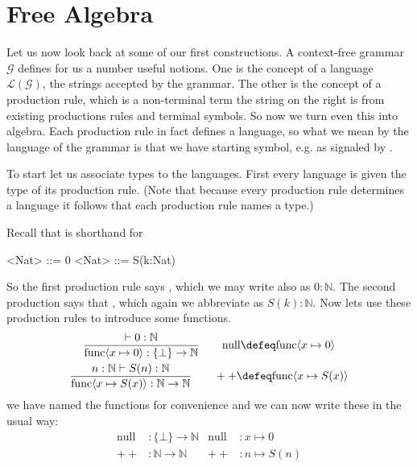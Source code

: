 
\section{Free Algebra}
Let us now look back at some of our first constructions.
A context-free grammar $\mathcal{G}$ defines for us a number 
useful notions.  One is the concept of a language 
$\mathcal{L}(\mathcal{G})$, the strings 
accepted by the grammar.  The other is the concept of a production 
rule, which is a non-terminal term  the string on the 
right is from existing productions rules and terminal symbols.  So 
now we turn even this into algebra.  Each production rule in fact defines a 
language, so what we mean by the language of the grammar is that we have 
starting symbol, e.g. as signaled by .  

To start let us associate types to the languages.  
First every language is given the type of its production rule.
(Note that because every production rule determines a language 
it follows that each production rule names a type.)

\begin{example}
    Recall that  is shorthand for 
\begin{Gcode}[]
<Nat> ::= 0
<Nat> ::= S(k:Nat)
\end{Gcode}
So the first production rule says , which we may write also 
as $0:\mathbb{N}$.
The second production says that , which again we abbreviate 
as $S(k):\mathbb{N}$.
Now lets use these production rules to introduce some functions.
\begin{gather*}
    \frac{
        \vdash 0:\mathbb{N}
    }{
        \text{func}\langle x\mapsto 0\rangle:\{\bot\}\to \mathbb{N}
    }
    \qquad 
    \text{null}\defeq \text{func}\langle x\mapsto 0\rangle
    \\
    \frac{
        n:\mathbb{N}\vdash S(n):\mathbb{N}
    }{
        \text{func}\langle x\mapsto S(x)\rangle:\mathbb{N}\to \mathbb{N}
    }
    \qquad 
    ++\defeq \text{func}\langle x\mapsto S(x)\rangle
\end{gather*}
we have named the functions for convenience and we can now write these 
in the usual way:
\begin{align*}
    \text{null}&:\{\bot\}\to \mathbb{N}
    & 
    \text{null}&:x\mapsto 0\\
    ++& :\mathbb{N}\to \mathbb{N}
    & 
    ++&:n\mapsto S(n)
\end{align*}
\end{example}


